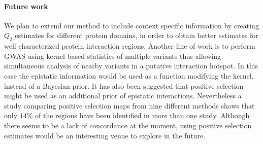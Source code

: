 \paragraph{Future work}
We plan to extend our method to include context specific information by creating $Q_2$ estimates for different protein domains, in order to obtain better estimates for well characterized protein interaction regions. 
Another line of work is to perform GWAS using kernel based statistics of multiple variants \cite{wu2011rare} thus allowing simultaneous analysis of nearby variants in a putative interaction hotspot. 
In this case the epistatic information would be used as a function modifying the kernel, instead of a Bayesian prior.
It has also been suggested that positive selection might be used as an additional prior of epistatic interactions. 
Nevertheless a study comparing positive selection maps from nine different methods \cite{akey2009constructing} shows that only $14\%$ of the regions have been identified in more than one study.
Although there seems to be a lack of concordance at the moment, using positive selection estimates would be an interesting venue to explore in the future.
